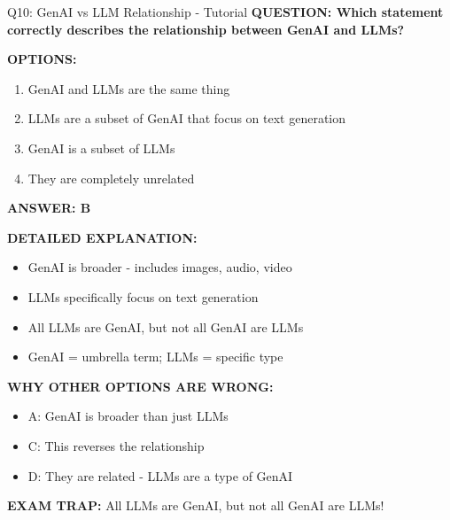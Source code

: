 \documentclass[8pt]{beamer}
\begin{document}
	\begin{frame}{Q10: GenAI vs LLM Relationship - Tutorial}
		\fontsize{6.5}{7.5}\selectfont
		\textbf{QUESTION: Which statement correctly describes the relationship between GenAI and LLMs?}
		
		\vspace{0.1cm}
		\textbf{OPTIONS:}
		\begin{enumerate}
			\item GenAI and LLMs are the same thing
			\item LLMs are a subset of GenAI that focus on text generation
			\item GenAI is a subset of LLMs
			\item They are completely unrelated
		\end{enumerate}
		
		\vspace{0.1cm}
		\textcolor{myblue}{\textbf{ANSWER: B}}
		
		\vspace{0.1cm}
		\textbf{DETAILED EXPLANATION:}
		\begin{itemize}
			\item GenAI is broader - includes images, audio, video
			\item LLMs specifically focus on text generation
			\item All LLMs are GenAI, but not all GenAI are LLMs
			\item GenAI = umbrella term; LLMs = specific type
		\end{itemize}
		
		\vspace{0.1cm}
		\textcolor{myred}{\textbf{WHY OTHER OPTIONS ARE WRONG:}}
		\begin{itemize}
			\item \textcolor{myred}{A:} GenAI is broader than just LLMs
			\item \textcolor{myred}{C:} This reverses the relationship
			\item \textcolor{myred}{D:} They are related - LLMs are a type of GenAI
		\end{itemize}
		
		\textcolor{myred}{\textbf{EXAM TRAP:}} All LLMs are GenAI, but \textcolor{myblue}{not all GenAI are LLMs}!
	\end{frame}
	
	
\end{document}
